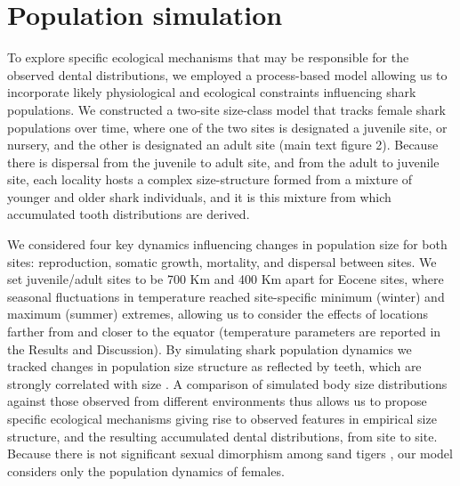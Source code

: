 \documentclass[]{rsos}%
\begin{document}
\section{Population simulation}

To explore specific ecological mechanisms that may be responsible for the observed dental distributions, we employed a process-based model allowing us to incorporate likely physiological and ecological constraints influencing shark populations.
We constructed a two-site size-class model that tracks female shark populations over time, where one of the two sites is designated a juvenile site, or nursery, and the other is designated an adult site (main text figure 2).
Because there is dispersal from the juvenile to adult site, and from the adult to juvenile site, each locality hosts a complex size-structure formed from a mixture of younger and older shark individuals, and it is this mixture from which accumulated tooth distributions are derived.

We considered four key dynamics influencing changes in population size for both sites: reproduction, somatic growth, mortality, and dispersal between sites.
We set juvenile/adult sites to be 700 Km \cite{Kneebone2012, Teter2015} and 400 Km apart for Eocene sites, where seasonal fluctuations in temperature reached site-specific minimum (winter) and maximum (summer) extremes, allowing us to consider the effects of locations farther from and closer to the equator (temperature parameters are reported in the Results and Discussion).
By simulating shark population dynamics we tracked changes in population size structure as reflected by teeth, which are strongly correlated with size \cite{Shimada2002}. 
A comparison of simulated body size distributions against those observed from different environments thus allows us to propose specific ecological mechanisms giving rise to observed features in empirical size structure, and the resulting accumulated dental distributions, from site to site.
Because there is not significant sexual dimorphism among sand tigers \cite{Goldman2006}, our model considers only the population dynamics of females.
\end{document}
